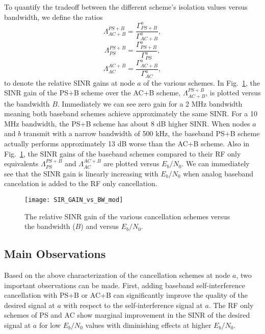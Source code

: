 \documentclass[12pt, journal,draftcls,letterpaper,onecolumn]{IEEEtran}
\begin{document}
To quantify the tradeoff between the different scheme's isolation values versus bandwidth, we define the ratios
\begin{equation}
\Lambda^{PS+B}_{AC+B} = \dfrac{\Gamma^a_{PS+B}}{\Gamma^a_{AC+B}},
\label{eq:gamma_gain}
\end{equation}
\begin{equation}
\Lambda^{PS+B}_{PS} = \dfrac{\Gamma^a_{PS+B}}{\Gamma^a_{PS}},
\end{equation}
\begin{equation}
\Lambda^{AC+B} _{AC}= \dfrac{\Gamma^a_{AC+B}}{\Gamma^a_{AC}},
\end{equation}
to denote the relative SINR gains at node $a$ of the various schemes.  In Fig.~\ref{fig:SIR_GAIN}, the SINR gain of the PS+B scheme over the AC+B scheme, $\Lambda^{PS+B}_{AC+B}$, is plotted versus the bandwidth $B$.  Immediately we can see zero gain for a 2 MHz bandwidth meaning both baseband schemes achieve approximately the same SINR.  For a 10 MHz bandwidth, the PS+B scheme has about 8 dB higher SINR.  When nodes $a$ and $b$ transmit with a narrow bandwidth of 500 kHz, the baseband PS+B scheme actually performs approximately 13 dB worse than the AC+B scheme.  Also in Fig.~\ref{fig:SIR_GAIN}, the SINR gains of the baseband schemes compared to their RF only equivalents $\Lambda^{PS+B}_{PS}$ and $\Lambda^{AC+B} _{AC}$ are plotted versus $E_b/N_0$.  We can immediately see that the SINR gain is linearly increasing with $E_b/N_0$ when analog baseband cancelation is added to the RF only cancellation.  
\begin{figure}[htp]
\begin{center} 
  \texttt{[image: SIR\_GAIN\_vs\_BW\_mod]}
\caption[fig:chan_ang]{The relative SINR gain of the various cancellation schemes versus the bandwidth ($B$) and versus $E_b/N_0$.} 
  \label{fig:SIR_GAIN}
\end{center} 
\end{figure}    


\subsection{Main Observations}
Based on the above characterization of the cancellation schemes at node $a$, two important observations can be made.  First, adding baseband self-interference cancellation with PS+B or AC+B can significantly improve the quality of the desired signal at $a$ with respect to the self-interference signal at $a$.  The RF only schemes of PS and AC show marginal improvement in the SINR of the desired signal at $a$ for low $E_b/N_0$ values with diminishing effects at higher $E_b/N_0$.  
\end{document}
